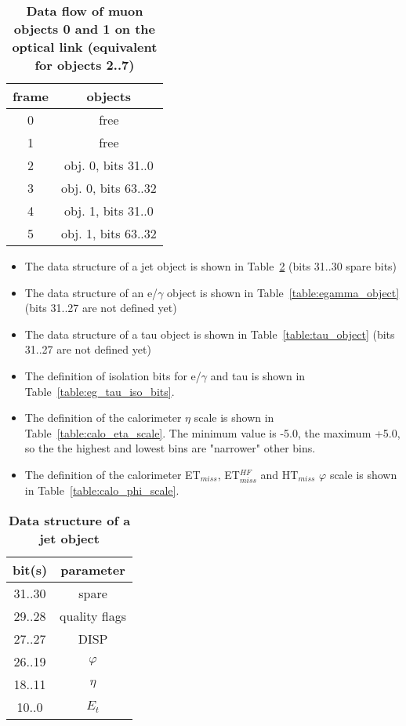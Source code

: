 \documentclass{cmspaper}
\begin{document}
\begin{table}[ht]
\caption{\bf Data flow of muon objects 0 and 1 on the optical link \rm(equivalent for objects 2..7)}
\vspace{5mm}
\centering
\begin{tabular}{|c|c|}\hline
frame & objects\\\hline\hline
0 & free \\\hline
1 & free \\\hline
2 & obj. 0, bits 31..0\\\hline
3 & obj. 0, bits 63..32 \\\hline
4 & obj. 1, bits 31..0 \\\hline
5 & obj. 1, bits 63..32 \\\hline
\end{tabular}
\label{table:opt_link_muon_obj_0_1}
\end{table}

\clearpage

\begin{itemize}
\item The data structure of a jet object is shown in Table~\ref{table:jet_object} (bits 31..30 spare bits)
\item The data structure of an e/$\gamma$ object is shown in Table~\ref{table:egamma_object} (bits 31..27 are not defined yet)
\item The data structure of a tau object is shown in Table~\ref{table:tau_object} (bits 31..27 are not defined yet)
\item The definition of isolation bits for e/$\gamma$ and tau is shown in Table~\ref{table:eg_tau_iso_bits}.
\item The definition of the calorimeter $\eta$ scale is shown in Table~\ref{table:calo_eta_scale}. The minimum value is -5.0, the maximum +5.0, so the the highest and lowest
bins are "narrower" other bins.
\item The definition of the calorimeter ET$_{miss}$, ET$_{miss}^{HF}$ and HT$_{miss}$ $\varphi$ scale is shown in Table~\ref{table:calo_phi_scale}.
\end{itemize}

\begin{table}[ht]
\caption{\bf Data structure of a jet object}
\vspace{5mm}
\centering
\begin{tabular}{|c|c|}\hline
bit(s) & parameter \\\hline\hline
31..30 & spare \\
29..28 & quality flags \\
27..27 & DISP \\
26..19 & $\varphi$ \\
18..11 & $\eta$ \\
10..0 & $E_t$ \\\hline
\end{tabular}
\label{table:jet_object}
\end{table}
\end{document}
